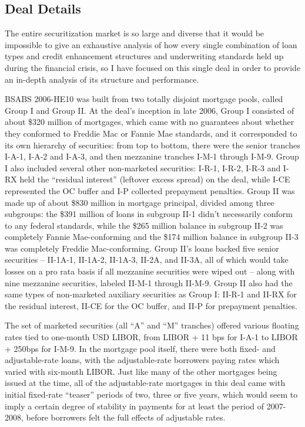 \documentclass[12pt]{article}
\begin{document}
\subsection*{Deal Details}

The entire securitization market is so large and diverse that it would be impossible to give an exhaustive analysis of how every single combination of loan types and credit enhancement structures and underwriting standards held up during the financial crisis, so I have focused on this single deal in order to provide an in-depth analysis of its structure and performance.

BSABS 2006-HE10 was built from two totally disjoint mortgage pools, called Group I and Group II. At the deal’s inception in late 2006, Group I consisted of about \$320 million of mortgages, which came with no guarantees about whether they conformed to Freddie Mac or Fannie Mae standards, and it corresponded to its own hierarchy of securities: from top to bottom, there were the senior tranches I-A-1, I-A-2 and I-A-3, and then mezzanine tranches I-M-1 through I-M-9. Group I also included several other non-marketed securities: I-R-1, I-R-2, I-R-3 and I-RX held the “residual interest” (leftover excess spread) on the deal, while I-CE represented the OC buffer and I-P collected prepayment penalties. Group II was made up of about \$830 million in mortgage principal, divided among three subgroups: the \$391 million of loans in subgroup II-1 didn’t necessarily conform to any federal standards, while the \$265 million balance in subgroup II-2 was completely Fannie Mae-conforming and the \$174 million balance in subgroup II-3 was completely Freddie Mac-conforming. Group II’s loans backed five senior securities – II-1A-1, II-1A-2, II-1A-3, II-2A, and II-3A, all of which would take losses on a pro rata basis if all mezzanine securities were wiped out – along with nine mezzanine securities, labeled II-M-1 through II-M-9. Group II also had the same types of non-marketed auxiliary securities as Group I: II-R-1 and II-RX for the residual interest, II-CE for the OC buffer, and II-P for prepayment penalties.

The set of marketed securities (all “A” and “M” tranches) offered various floating rates tied to one-month USD LIBOR, from LIBOR + 11 bps for I-A-1 to LIBOR + 250bps for I-M-9. In the mortgage pool itself, there were both fixed- and adjustable-rate loans, with the adjustable-rate borrowers paying rates which varied with six-month LIBOR. Just like many of the other mortgages being issued at the time, all of the adjustable-rate mortgages in this deal came with initial fixed-rate “teaser” periods of two, three or five years, which would seem to imply a certain degree of stability in payments for at least the period of 2007-2008, before borrowers felt the full effects of adjustable rates.
\end{document}
